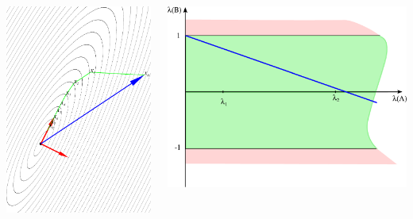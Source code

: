 \documentclass[professionalfonts,compress,unicode]{beamer}
\begin{document}
{
\begin{columns}
\begin{column}{0.5\textwidth}
\includegraphics[width=\columnwidth]{si0_20.pdf}%
\end{column}
\begin{column}{0.5\textwidth}
\includegraphics[width=\columnwidth]{lAlB0_20.pdf}%
\end{column}
\end{columns}
}
\end{document}
